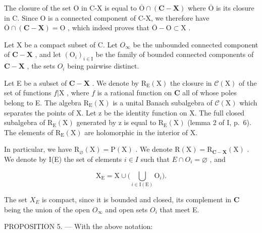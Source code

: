 The closure of the set O in C-X is equal to \(\overline{\mathrm{O}}\cap (\mathbf{C} - \mathbf{X})\) where \(\overline{\mathrm{O}}\) is its closure in C. Since O is a connected component of C-X, we therefore have \(\overline{\mathrm{O}}\cap (\mathbf{C} - \mathbf{X}) = \mathrm{O}\) , which indeed proves that \(\overline{\mathrm{O}} -\mathrm{O}\subset \mathrm{X}\) .

Let X be a compact subset of C. Let \(O_{\infty}\) be the unbounded connected component of \(\mathbf{C} - \mathbf{X}\) , and let \((\mathrm{O}_{i})_{i\in\mathrm{I}}\) be the family of bounded connected components of \(\mathbf{C} - \mathbf{X}\) , the sets \(O_{i}\) being pairwise distinct.

Let E be a subset of \(\mathbf{C} - \mathbf{X}\) . We denote by \(\mathrm{R}_{\mathrm{E}}(\mathrm{X})\) the closure in \(\mathcal{C}(\mathrm{X})\) of the set of functions \(f|\mathrm{X}\) , where \(f\) is a rational function on \(\mathbf{C}\) all of whose poles belong to E. The algebra \(\mathrm{R}_{\mathrm{E}}(\mathrm{X})\) is a unital Banach subalgebra of \(\mathcal{C}(\mathrm{X})\) which separates the points of X. Let z be the identity function on X. The full closed subalgebra of \(\mathrm{R}_{\mathrm{E}}(\mathrm{X})\) generated by z is equal to \(\mathrm{R}_{\mathrm{E}}(\mathrm{X})\) (lemma 2 of I, p.~6). The elements of \(\mathrm{R}_{\mathrm{E}}(\mathrm{X})\) are holomorphic in the interior of X.

In particular, we have \(\mathrm{R}_{\varnothing}(\mathrm{X})=\mathrm{P}(\mathrm{X})\) . We denote \(\mathrm{R}(\mathrm{X})=\mathrm{R}_{\mathbf{C}-\mathbf{X}}(\mathrm{X})\) . We denote by I(E) the set of elements \(i\in I\) such that \(E\cap O_{i}=\varnothing\) , and

\[
\mathrm{X} _ {\mathrm{E}} = \mathrm{X} \cup \Big (\bigcup_ {i \in \mathrm{I} (\mathrm{E})} \mathrm{O} _ {i} \Big).
\]

The set \(X_{E}\) is compact, since it is bounded and closed, its complement in \(\mathbf{C}\) being the union of the open \(O_{\infty}\) and open sets \(O_{i}\) that meet E.

PROPOSITION 5. --- With the above notation:

